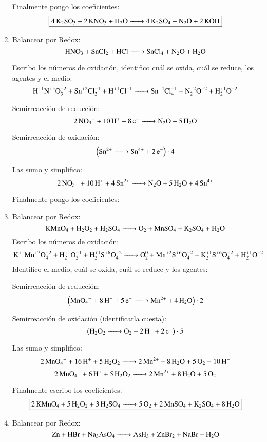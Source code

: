 \begin{enumerate}
Finalmente pongo los coeficientes:
$$\fbox{\ce{4K2SO3 + 2KNO3 + H2O ->
4K2SO4 + N2O + 2KOH}}$$

\item
Balancear por Redox:
$$\ce{
HNO3 + SnCl2 + HCl ->
SnCl4 + N2O + H2O
}$$

Escribo los números de oxidación, identifico cuál se oxida, cuál se reduce, los agentes y el medio:
$$\ce{
H^{+1}N^{+5}O^{-2}3 + Sn^{+2}Cl^{-1}2 + H^{+1}Cl^{-1} ->
Sn^{+4}Cl^{-1}4 + N^{+2}2O^{-2} + H^{+1}2O^{-2}
}$$


\begin{multicols}{2}
Semirreacción de reducción:
$$\ce{
2NO_3^- +10H^+ + 8e^- ->
N2O + 5H2O
}$$

Semirreacción de oxidación:
$$\left(\ce{
Sn^{2+} ->
Sn^{4+} + 2e^-
}\right)\cdot 4$$
\end{multicols}

Las sumo y simplifico:
$$\ce{
2NO_3^- + 10H^+ + 4Sn^{2+} ->
N2O + 5H2O + 4Sn^{4+}
}$$

Finalmente pongo los coeficientes:

\hfil{}\hfil


\item 
Balancear por Redox:
$$\ce{KMnO4 + H2O2 + H2SO4 -> O2 + MnSO4 + K2SO4 + H2O}$$
Escribo los números de oxidación:
$$\ce{
K^{+1}Mn^{+7}O^{-2}4 + H^{+1}2O^{-1}2 + H^{+1}2S^{+6}O^{-2}4 ->
O^{0}2 + Mn^{+2}S^{+6}O^{-2}4 + K^{+1}2S^{+6}O^{-2}4 + H^{+1}2O^{-2}
}$$
Identifico el medio, cuál se oxida, cuál se reduce y los agentes:

\vspace{0.5\baselineskip}
\begin{multicols}{2}
Semirreacción de reducción:
$$\left(\ce{
MnO4^- + 8H^+ + 5e^- ->
Mn^{2+} + 4H2O
}\right) \cdot 2$$

Semirreacción de oxidación (identificarla cuesta):
$$\left(\ce{
H2O2 ->
O2 + 2H^+ + 2e^-
}\right) \cdot 5$$
\end{multicols}
    
Las sumo y simplifico:
$$\ce{
2MnO4^- + 16H^+ + 5H2O2 ->
2Mn^{2+} + 8H2O + 5O2 + 10H^+
}$$
$$\ce{
2MnO4^- + 6H^+ + 5H2O2 ->
2Mn^{2+} + 8H2O + 5O2
}$$

Finalmente escribo los coeficientes:
$$\fbox{\ce{2KMnO4 + 5H2O2 + 3H2SO4 -> 5O2 + 2MnSO4 + K2SO4 + 8H2O}}$$


\item Balancear por Redox:
$$\ce{
Zn + HBr + Na3AsO4 -> AsH3 + ZnBr2 + NaBr + H2O
}$$


\end{enumerate}
